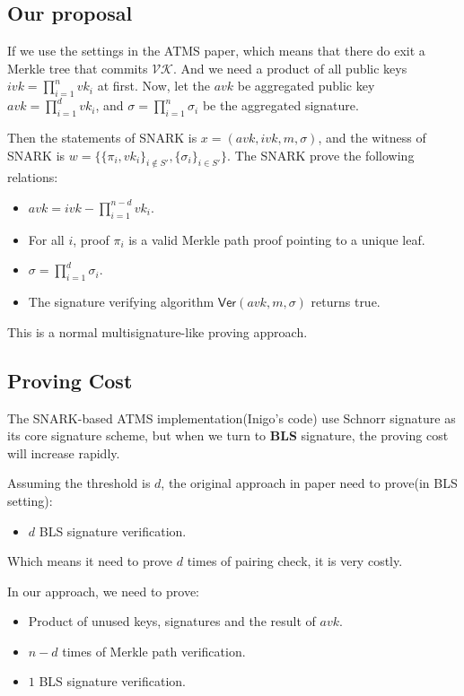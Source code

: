 \documentclass{article}
\begin{document}
\subsection{Our proposal}

If we use the settings in the ATMS paper, which means that there do exit a Merkle tree that commits $\mathcal{VK}$. And we need a product of all public keys $ ivk = \prod_{i=1}^n vk_i$ at first. Now, let the $avk$ be aggregated public key $avk =  \prod_{i=1}^d vk_i$, and $\sigma = \prod_{i=1}^n \sigma_i$ be the aggregated signature.

Then the statements of SNARK is $x = (avk,ivk,m,\sigma)$, and the witness of SNARK is $w = \{\{\pi_i, vk_i\}_{i \notin S'}, \{\sigma_i\}_{i \in S'}\}$. The SNARK prove the following relations:

\begin{itemize}
    \item $avk = ivk - \prod_{i=1}^{n-d} vk_i$.
    \item For all $i$, proof $\pi_i$ is a valid Merkle path proof pointing to a unique leaf.
    \item $\sigma = \prod_{i=1}^d \sigma_i$.
    \item The signature verifying algorithm $\mathsf{Ver}(avk,m,
    \sigma)$ returns true.
\end{itemize}


This is a normal multisignature-like proving approach.


\subsection{Proving Cost}

The SNARK-based ATMS implementation(Inigo's code) use Schnorr signature as its core signature scheme, but when we turn to \textbf{BLS} signature, the proving cost will increase rapidly.

Assuming the threshold is $d$, the original approach in paper need to prove(in BLS setting):

\begin{itemize}
    \item $d$ BLS signature verification.
\end{itemize}

Which means it need to prove $d$ times of pairing check, it is very costly.


In our approach, we need to prove:

\begin{itemize}
    \item Product of unused keys, signatures and the result of $avk$.
    \item $n-d$ times of Merkle path verification.
    \item $1$ BLS signature verification.
\end{itemize}
\end{document}
